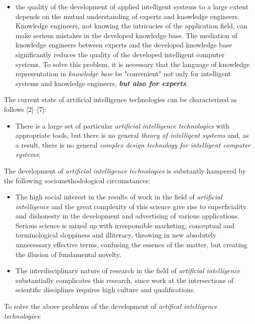 \documentclass[10pt, a4paper]{proc}
\begin{document}
\begin{itemize}
  \item the quality of the development of applied intelligent systems to a large extent depends on the mutual understanding of experts and knowledge engineers. Knowledge engineers, not knowing the intricacies of the application field, can make serious mistakes in the developed knowledge base. The mediation of knowledge engineers between experts and the developed knowledge base significantly reduces the quality of the developed intelligent computer systems. To solve this problem, it is necessary that the language of knowledge representation in \textit{knowledge base} be "convenient" not only for intelligent systems and knowledge engineers, \textit{\textbf{but also for experts}}.
 \end{itemize}
 The current state of artificial intelligence technologies can be characterized as follows [2]–[7]:
 \begin{itemize}
  \item There is a large set of particular \textit{artificial intelligence technologies} with appropriate tools, but there is no general \textit{theory of intelligent systems} and, as a result, there is no general \textit{complex design technology for intelligent computer systems};
 \end{itemize}
 The development of \textit{artificial intelligence technologies} is substantly hampered by the following sociomethodological circumstances:
 \begin{itemize}
  \item The high social interest in the results of work in the field of \textit{artificial intelligence} and the great complexity of this science give rise to superficiality and dishonesty in the development and advertising of various applications. Serious science is mixed up with irresponsible marketing, conceptual and terminological sloppiness and illiteracy, throwing in new absolutely unnecessary effective terms, confusing the essence of the matter, but creating the illusion of fundamental novelty.
  \item The interdisciplinary nature of research in the field of \textit{artificial intelligence} substantially complicates this research, since work at the intersections of scientific disciplines requires high culture and qualifications.
 \end{itemize}
 To solve the above problems of the development of \textit{artifical intelligence technologies}:
\end{document}
